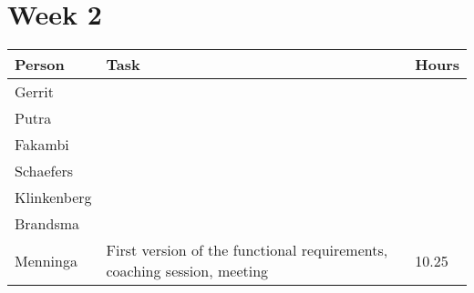 \section{Week 2}
\begin{tabular}{p{} p{} p{}}
    \textbf{Person} & \textbf{Task} & \textbf{Hours} \\ \hline
	Gerrit &  &  \\ \hline
	Putra &  &  \\ \hline
	Fakambi & & \\ \hline
	Schaefers &  & \\ \hline
	Klinkenberg & & \\ \hline
	Brandsma &  & \\ \hline
	Menninga & First version of the functional requirements, coaching session, meeting & 10.25 \\ \hline
\end{tabular}